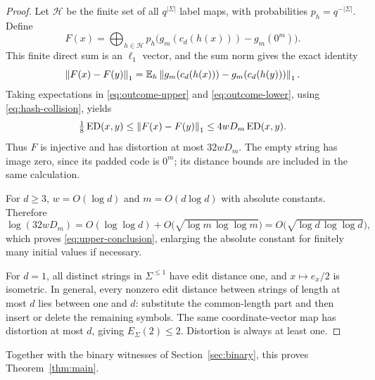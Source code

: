 \begin{proof}
Let $\mathcal H$ be the finite set of all $q^{|\Sigma|}$ label maps,
with probabilities $p_h=q^{-|\Sigma|}$. Define
\begin{equation}\label{eq:upper-direct-sum}
 F(x)=\bigoplus_{h\in\mathcal H}
 p_h\bigl(g_m(c_d(h(x)))-g_m(0^m)\bigr).
\end{equation}
This finite direct sum is an $\ell_1$ vector, and the sum norm gives
the exact identity
\[
 \left\lVert F(x)-F(y)\right\rVert_1
 =\mathbb E_h\left\lVert g_m(c_d(h(x)))-g_m(c_d(h(y)))\right\rVert_1.
\]
Taking expectations in \eqref{eq:outcome-upper} and
\eqref{eq:outcome-lower}, using \eqref{eq:hash-collision}, yields
\begin{equation}\label{eq:upper-metric}
 \tfrac18\operatorname{ED}(x,y)\le\left\lVert F(x)-F(y)\right\rVert_1
 \le4wD_m\operatorname{ED}(x,y).
\end{equation}
Thus $F$ is injective and has distortion at most $32wD_m$.
The empty string has image zero, since its padded code is $0^m$;
its distance bounds are included in the same calculation.

For $d\ge3$, $w=O(\log d)$ and $m=O(d\log d)$ with absolute
constants. Therefore
\[
 \log(32wD_m)
 =O(\log\log d)+
 O\!\bigl(\sqrt{\log m\,\log\log m}\bigr)
 =O\!\bigl(\sqrt{\log d\,\log\log d}\bigr),
\]
which proves \eqref{eq:upper-conclusion}, enlarging the absolute
constant for finitely many initial values if necessary.

For $d=1$, all distinct strings in $\Sigma^{\le1}$ have edit distance
one, and $x\mapsto e_x/2$ is isometric. In general, every nonzero edit
distance between strings of length at most $d$ lies between one and
$d$: substitute the common-length part and then insert or delete the
remaining symbols. The same coordinate-vector map has distortion at
most $d$, giving $E_\Sigma(2)\le2$. Distortion is always at least one.
\end{proof}

Together with the binary witnesses of Section~\ref{sec:binary}, this
proves Theorem~\ref{thm:main}.
